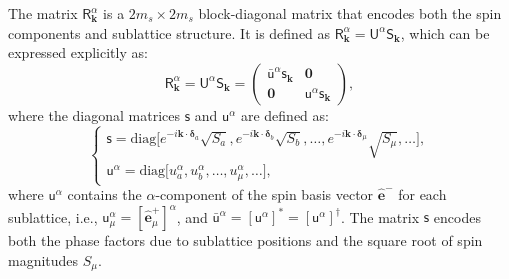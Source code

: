 The matrix $\mathsf{R}^{\alpha}_{\mathbf{k}}$ is a $2m_s \times 2m_s$ block-diagonal matrix that encodes both the spin components and sublattice structure. It is defined as $\mathsf{R}^{\alpha}_{\mathbf{k}} = \mathsf{U}^{\alpha} \mathsf{S}_{\mathbf{k}}$, which can be expressed explicitly as:
\begin{equation}
    \mathsf{R}^{\alpha}_{\mathbf{k}} 
    = \mathsf{U}^{\alpha} \mathsf{S}_{\mathbf{k}}
    =
    \begin{pmatrix}
        \bar{\mathsf{u}}^{\alpha} \mathsf{s}_{\mathbf{k}} & \mathbf{0} \\
        \mathbf{0} & \mathsf{u}^{\alpha} \mathsf{s}_{\mathbf{k}} 
    \end{pmatrix},
\end{equation}
where the diagonal matrices $\mathsf{s}$ and $\mathsf{u}^{\alpha}$ are defined as:
\begin{equation}
    \begin{cases}
        \mathsf{s} = \text{diag} \big[ e^{-i \mathbf{k} \cdot \boldsymbol{\delta}_a} \sqrt{S_a}, e^{-i \mathbf{k} \cdot \boldsymbol{\delta}_b} \sqrt{S_b}, \dots, e^{-i \mathbf{k} \cdot \boldsymbol{\delta}_\mu} \sqrt{S_\mu}, \dots \big], \\
        \mathsf{u}^{\alpha} = \text{diag} \big[ u_a^{\alpha}, u_b^{\alpha}, \dots, u_\mu^{\alpha}, \dots \big],
    \end{cases}
\end{equation}
where $\mathsf{u}^{\alpha}$ contains the $\alpha$-component of the spin basis vector $\hat{\mathbf{e}}^-$ for each sublattice, i.e., $\mathsf{u}^{\alpha}_\mu = [\hat{\mathbf{e}}^+_\mu]^{\alpha}$, and $\bar{\mathsf{u}}^{\alpha} = [\mathsf{u}^{\alpha}]^* = [\mathsf{u}^{\alpha}]^{\dagger}$. The matrix $\mathsf{s}$ encodes both the phase factors due to sublattice positions and the square root of spin magnitudes $S_\mu$.

